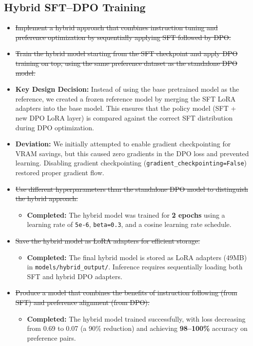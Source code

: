 \documentclass[11pt,a4paper]{article}
\begin{document}
\subsection{Hybrid SFT--DPO Training}

\begin{itemize}
    \item \sout{Implement a hybrid approach that combines instruction tuning and preference optimization by sequentially applying SFT followed by DPO.}
    \item \sout{Train the hybrid model starting from the SFT checkpoint and apply DPO training on top, using the same preference dataset as the standalone DPO model.}

    \item \textbf{Key Design Decision:} Instead of using the base pretrained model as the reference, we created a frozen reference model by merging the SFT LoRA adapters into the base model. This ensures that the policy model (SFT + new DPO LoRA layer) is compared against the correct SFT distribution during DPO optimization.

    \item \textbf{Deviation:} We initially attempted to enable gradient checkpointing for VRAM savings, but this caused zero gradients in the DPO loss and prevented learning. Disabling gradient checkpointing (\texttt{gradient\_checkpointing=False}) restored proper gradient flow.

    \item \sout{Use different hyperparameters than the standalone DPO model to distinguish the hybrid approach.}
    \begin{itemize}
        \item \textbf{Completed:} The hybrid model was trained for \textbf{2 epochs} using a learning rate of \texttt{5e-6}, \texttt{beta=0.3}, and a cosine learning rate schedule.
    \end{itemize}

    \item \sout{Save the hybrid model as LoRA adapters for efficient storage.}
    \begin{itemize}
        \item \textbf{Completed:} The final hybrid model is stored as LoRA adapters (49MB) in \texttt{models/hybrid\_output/}. Inference requires sequentially loading both SFT and hybrid DPO adapters.
    \end{itemize}

    \item \sout{Produce a model that combines the benefits of instruction following (from SFT) and preference alignment (from DPO).}
    \begin{itemize}
        \item \textbf{Completed:} The hybrid model trained successfully, with loss decreasing from 0.69 to 0.07 (a 90\% reduction) and achieving \textbf{98--100\%} accuracy on preference pairs.
    \end{itemize}
\end{itemize}
\end{document}
